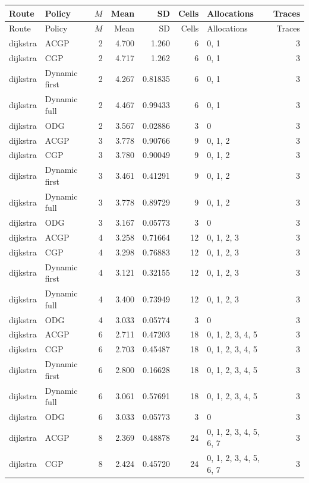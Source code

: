\documentclass[10pt,a4paper]{article}
\begin{document}
\tiny\setlength{\tabcolsep}{2pt}\begin{longtable}{@{}p{23mm}p{29mm}rrrrp{36mm}r@{}}
\toprule Route & Policy & $M$ & Mean & SD & Cells & Allocations & Traces \\ \midrule\endfirsthead
\toprule Route & Policy & $M$ & Mean & SD & Cells & Allocations & Traces \\ \midrule\endhead
\bottomrule\endfoot
dijkstra & ACGP & 2 & 4.700 & 1.260 & 6 & 0, 1 & 3 \\
dijkstra & CGP & 2 & 4.717 & 1.262 & 6 & 0, 1 & 3 \\
dijkstra & Dynamic first & 2 & 4.267 & 0.81835 & 6 & 0, 1 & 3 \\
dijkstra & Dynamic full & 2 & 4.467 & 0.99433 & 6 & 0, 1 & 3 \\
dijkstra & ODG & 2 & 3.567 & 0.02886 & 3 & 0 & 3 \\
dijkstra & ACGP & 3 & 3.778 & 0.90766 & 9 & 0, 1, 2 & 3 \\
dijkstra & CGP & 3 & 3.780 & 0.90049 & 9 & 0, 1, 2 & 3 \\
dijkstra & Dynamic first & 3 & 3.461 & 0.41291 & 9 & 0, 1, 2 & 3 \\
dijkstra & Dynamic full & 3 & 3.778 & 0.89729 & 9 & 0, 1, 2 & 3 \\
dijkstra & ODG & 3 & 3.167 & 0.05773 & 3 & 0 & 3 \\
dijkstra & ACGP & 4 & 3.258 & 0.71664 & 12 & 0, 1, 2, 3 & 3 \\
dijkstra & CGP & 4 & 3.298 & 0.76883 & 12 & 0, 1, 2, 3 & 3 \\
dijkstra & Dynamic first & 4 & 3.121 & 0.32155 & 12 & 0, 1, 2, 3 & 3 \\
dijkstra & Dynamic full & 4 & 3.400 & 0.73949 & 12 & 0, 1, 2, 3 & 3 \\
dijkstra & ODG & 4 & 3.033 & 0.05774 & 3 & 0 & 3 \\
dijkstra & ACGP & 6 & 2.711 & 0.47203 & 18 & 0, 1, 2, 3, 4, 5 & 3 \\
dijkstra & CGP & 6 & 2.703 & 0.45487 & 18 & 0, 1, 2, 3, 4, 5 & 3 \\
dijkstra & Dynamic first & 6 & 2.800 & 0.16628 & 18 & 0, 1, 2, 3, 4, 5 & 3 \\
dijkstra & Dynamic full & 6 & 3.061 & 0.57691 & 18 & 0, 1, 2, 3, 4, 5 & 3 \\
dijkstra & ODG & 6 & 3.033 & 0.05773 & 3 & 0 & 3 \\
dijkstra & ACGP & 8 & 2.369 & 0.48878 & 24 & 0, 1, 2, 3, 4, 5, 6, 7 & 3 \\
dijkstra & CGP & 8 & 2.424 & 0.45720 & 24 & 0, 1, 2, 3, 4, 5, 6, 7 & 3 \\

\end{longtable}
\end{document}
